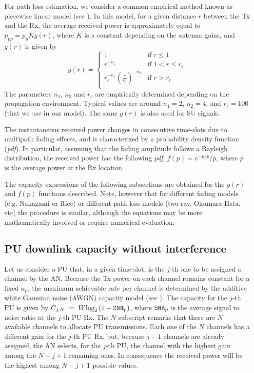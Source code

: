 For path loss estimation, we consider a common empirical method known as piecewise linear model (see \cite{ref:Goldsmith}). In this model, for a given distance $r$ between the Tx and the Rx, the average received power is approximately equal to $p_{pp}=p_{p}Kg(r)$, where $K$ is a constant depending on the antenna gains, and $g(r)$ is given by
\begin{equation}
g(r) =  
\begin{cases}
1 &\mbox{if }r\leq 1\\
r^{-n_{1}} &\mbox{if }1<r\leq r_{c}\\
r_{c}^{-n_{1}}\left(\frac{r}{r_{c}}\right)^{-n_{2}} &\mbox{if }r> r_{c}\\
\end{cases}
\end{equation}
The parameters $n_{1}$, $n_{2}$ and $r_{c}$ are empirically determined depending on the propagation environment. Typical values are around $n_{1}=2$, $n_{2}=4$, and $r_{c}=100$ (that we use in our model).
The same $g(r)$ is also used for SU signals.

The instantaneous received power changes in consecutive time-slots due to multipath fading effects, and is characterized by a probability density function (\textit{pdf}).
In particular, assuming that the fading amplitude follows a Rayleigh distribution, the received power has the following \textit{pdf}, $f(p)=e^{-p/\bar{p}}/\bar{p}$, where $\bar{p}$ is the average power at the Rx location.


The capacity expressions of the following subsections are obtained for the $g(r)$ and $f(p)$ functions described. Note, however that for different fading models (e.g. Nakagami or Rice) or different path loss models (two ray, Okumura-Hata, etc) the procedure is similar, although the equations may be more mathematically involved or require numerical evaluation. 

\subsection{PU downlink capacity without interference}
Let us consider a PU that, in a given time-slot, is the $j$-th one to be assigned a channel by the AN. 
Because the Tx power on each channel remains constant for a fixed $n_{p}$, the maximum achievable rate per channel is determined by the additive white Gaussian noise (AWGN) capacity model (see \cite{ref:Goldsmith}).
The capacity for the $j$-th PU is given by $C_{j,N}~=~W\text{log}_{2}\left(1+\text{\ttfamily{SNR}}_{p}\right)$, where $\text{\ttfamily{SNR}}_{p}$ is the average signal to noise ratio at the $j$-th PU Rx.
The $N$ subscript remarks that there are $N$ available channels to allocate PU transmissions.
Each one of the $N$ channels has a different gain for the $j$-th PU Rx, but, because $j-1$ channels are already assigned, the AN selects, for the $j$-th PU, the channel with the highest gain among the $N-j+1$ remaining ones. 
In consequence the received power will be the highest among $N-j+1$ possible values. 

